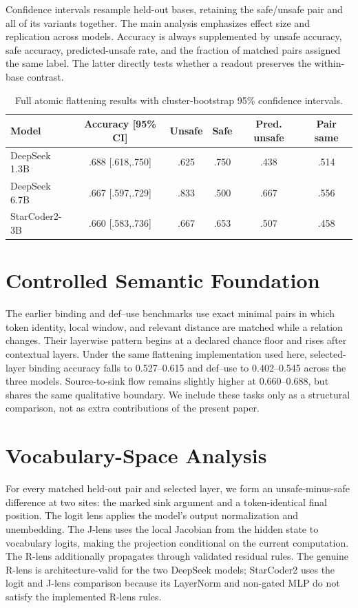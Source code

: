 \documentclass{article}
\begin{document}
Confidence intervals resample held-out bases, retaining the safe/unsafe pair and all of its variants together. The main analysis emphasizes effect size and replication across models. Accuracy is always supplemented by unsafe accuracy, safe accuracy, predicted-unsafe rate, and the fraction of matched pairs assigned the same label. The latter directly tests whether a readout preserves the within-base contrast.

\begin{table}[h]
\centering\small
\caption{Full atomic flattening results with cluster-bootstrap 95\% confidence intervals.}
\begin{tabular}{lccccc}
\toprule
Model & Accuracy [95\% CI] & Unsafe & Safe & Pred. unsafe & Pair same\\
\midrule
DeepSeek 1.3B & .688 [.618,.750] & .625 & .750 & .438 & .514\\
DeepSeek 6.7B & .667 [.597,.729] & .833 & .500 & .667 & .556\\
StarCoder2-3B & .660 [.583,.736] & .667 & .653 & .507 & .458\\
\bottomrule
\end{tabular}
\end{table}

\section{Controlled Semantic Foundation}\label{app:foundation}
The earlier binding and def--use benchmarks use exact minimal pairs in which token identity, local window, and relevant distance are matched while a relation changes. Their layerwise pattern begins at a declared chance floor and rises after contextual layers. Under the same flattening implementation used here, selected-layer binding accuracy falls to 0.527--0.615 and def--use to 0.402--0.545 across the three models. Source-to-sink flow remains slightly higher at 0.660--0.688, but shares the same qualitative boundary. We include these tasks only as a structural comparison, not as extra contributions of the present paper.

\section{Vocabulary-Space Analysis}\label{app:lenses}
For every matched held-out pair and selected layer, we form an unsafe-minus-safe difference at two sites: the marked sink argument and a token-identical final position. The logit lens applies the model's output normalization and unembedding. The J-lens uses the local Jacobian from the hidden state to vocabulary logits, making the projection conditional on the current computation. The R-lens additionally propagates through validated residual rules. The genuine R-lens is architecture-valid for the two DeepSeek models; StarCoder2 uses the logit and J-lens comparison because its LayerNorm and non-gated MLP do not satisfy the implemented R-lens rules.
\end{document}
